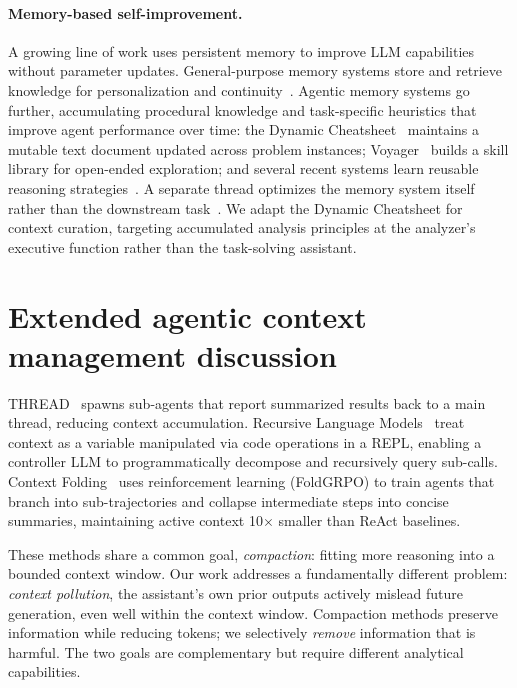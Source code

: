 \documentclass{article} %
\begin{document}
\paragraph{Memory-based self-improvement.}
A growing line of work uses persistent memory to improve LLM capabilities without parameter updates. General-purpose memory systems store and retrieve knowledge for personalization and continuity~\citep{xu2025amem,zhou2025mem1}. Agentic memory systems go further, accumulating procedural knowledge and task-specific heuristics that improve agent performance over time: the Dynamic Cheatsheet~\citep{suzgun2025cheatsheet} maintains a mutable text document updated across problem instances; Voyager~\citep{wang2023voyager} builds a skill library for open-ended exploration; and several recent systems learn reusable reasoning strategies~\citep{ouyang2026reasoningbank,ho2025arcmemo,fang2026memp,wu2025evolver,zhang2026ace}. A separate thread optimizes the memory system itself rather than the downstream task~\citep{zhang2025memevolve,xiong2026alma}. We adapt the Dynamic Cheatsheet for context curation, targeting accumulated analysis principles at the analyzer's executive function rather than the task-solving assistant.

\section{Extended agentic context management discussion}
\label{app:agentic-context}

THREAD~\citep{schroeder2025thread} spawns sub-agents that report summarized results back to a main thread, reducing context accumulation. Recursive Language Models~\citep{zhang2025rlm} treat context as a variable manipulated via code operations in a REPL, enabling a controller LLM to programmatically decompose and recursively query sub-calls. Context Folding~\citep{sun2025contextfolding} uses reinforcement learning (FoldGRPO) to train agents that branch into sub-trajectories and collapse intermediate steps into concise summaries, maintaining active context 10$\times$ smaller than ReAct baselines.

These methods share a common goal, \emph{compaction}: fitting more reasoning into a bounded context window. Our work addresses a fundamentally different problem: \emph{context pollution}, the assistant's own prior outputs actively mislead future generation, even well within the context window. Compaction methods preserve information while reducing tokens; we selectively \emph{remove} information that is harmful. The two goals are complementary but require different analytical capabilities.
\end{document}
